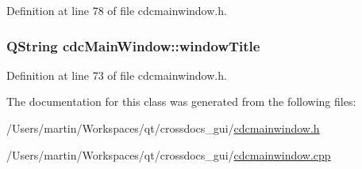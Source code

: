 Definition at line 78 of file cdcmainwindow.\+h.

\hypertarget{classcdc_main_window_a1ca58eeaa25a25ef5f1dbc6772d0853a}{
\subsubsection[{window\+Title}]{\setlength{\rightskip}{0pt plus 5cm}Q\+String cdc\+Main\+Window\+::window\+Title\hspace{0.3cm}{\ttfamily [private]}}}\label{classcdc_main_window_a1ca58eeaa25a25ef5f1dbc6772d0853a}


Definition at line 73 of file cdcmainwindow.\+h.



The documentation for this class was generated from the following files\+:\begin{DoxyCompactItemize}
\item 
/\+Users/martin/\+Workspaces/qt/crossdocs\+\_\+gui/\hyperlink{cdcmainwindow_8h}{cdcmainwindow.\+h}\item 
/\+Users/martin/\+Workspaces/qt/crossdocs\+\_\+gui/\hyperlink{cdcmainwindow_8cpp}{cdcmainwindow.\+cpp}\end{DoxyCompactItemize}

